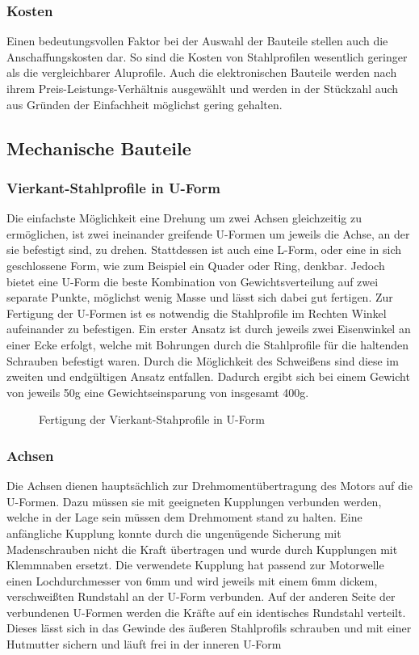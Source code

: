 \documentclass[a4paper, 12pt, bibtotocnumbered, liststotocnumbered]{scrartcl}
\begin{document}
	\subsubsection{Kosten}
	Einen bedeutungsvollen Faktor bei der Auswahl der Bauteile stellen auch die Anschaffungskosten dar. So sind die Kosten von Stahlprofilen wesentlich geringer als die vergleichbarer Aluprofile. Auch die elektronischen Bauteile werden nach ihrem Preis-Leistungs-Verhältnis ausgewählt und werden in der Stückzahl auch aus Gründen der Einfachheit möglichst gering gehalten.

	\subsection{Mechanische Bauteile}
	\subsubsection{Vierkant-Stahlprofile in U-Form}
	Die einfachste Möglichkeit eine Drehung um zwei Achsen gleichzeitig zu ermöglichen, ist zwei ineinander greifende U-Formen um jeweils die Achse, an der sie befestigt sind, zu drehen. Stattdessen ist auch eine L-Form, oder eine in sich geschlossene Form, wie zum Beispiel ein Quader oder Ring, denkbar. Jedoch bietet eine U-Form die beste Kombination von Gewichtsverteilung auf zwei separate Punkte, möglichst wenig Masse und lässt sich dabei gut fertigen.
Zur Fertigung der U-Formen ist es notwendig die Stahlprofile im Rechten Winkel aufeinander zu befestigen. Ein erster Ansatz ist durch jeweils zwei Eisenwinkel an einer Ecke erfolgt, welche mit Bohrungen durch die Stahlprofile für die haltenden Schrauben befestigt waren. Durch die Möglichkeit des Schweißens sind diese im zweiten und endgültigen Ansatz entfallen. Dadurch ergibt sich bei einem Gewicht von jeweils 50g eine Gewichtseinsparung von insgesamt 400g.

	\begin{figure}[htb]
		\centering
		\hfill
		\caption{Fertigung der Vierkant-Stahprofile in U-Form}
	\end{figure}

	\subsubsection{Achsen}
	Die Achsen dienen hauptsächlich zur Drehmomentübertragung des Motors auf die U-Formen. Dazu müssen sie mit geeigneten Kupplungen verbunden werden, welche in der Lage sein müssen dem Drehmoment stand zu halten. Eine anfängliche Kupplung konnte durch die ungenügende Sicherung mit Madenschrauben nicht die Kraft übertragen und wurde durch Kupplungen mit Klemmnaben ersetzt. Die verwendete Kupplung hat passend zur Motorwelle einen Lochdurchmesser von 6mm und wird jeweils mit einem 6mm dickem, verschweißten Rundstahl an der U-Form verbunden. Auf der anderen Seite der verbundenen U-Formen werden die Kräfte auf ein identisches Rundstahl verteilt. Dieses lässt sich in das Gewinde des äußeren Stahlprofils schrauben und mit einer Hutmutter sichern und läuft frei in der inneren U-Form
\end{document}
